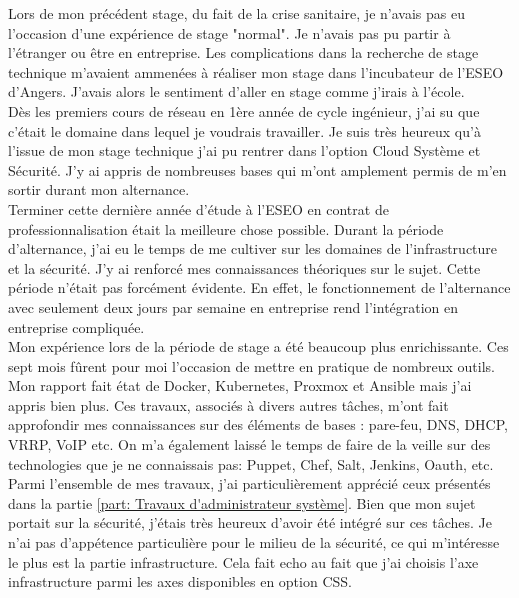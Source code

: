 \documentclass[12pt, a4paper, twoside]{article}
\begin{document}
Lors de mon précédent stage, du fait de la crise sanitaire, je n'avais pas eu l'occasion d'une expérience de stage "normal".
Je n'avais pas pu partir à l'étranger ou être en entreprise.
Les complications dans la recherche de stage technique m'avaient ammenées à réaliser mon stage dans l'incubateur de l'ESEO d'Angers.
J'avais alors le sentiment d'aller en stage comme j'irais à l'école.\\

Dès les premiers cours de réseau en 1ère année de cycle ingénieur, j'ai su que c'était le domaine dans lequel je voudrais travailler.
Je suis très heureux qu'à l'issue de mon stage technique j'ai pu rentrer dans l'option Cloud Système et Sécurité.
J'y ai appris de nombreuses bases qui m'ont amplement permis de m'en sortir durant mon alternance.\\

Terminer cette dernière année d'étude à l'ESEO en contrat de professionnalisation était la meilleure chose possible.
Durant la période d'alternance, j'ai eu le temps de me cultiver sur les domaines de l'infrastructure et la sécurité.
J'y ai renforcé mes connaissances théoriques sur le sujet.
Cette période n'était pas forcément évidente. 
En effet, le fonctionnement de l'alternance avec seulement deux jours par semaine en entreprise rend l'intégration en entreprise compliquée.\\

Mon expérience lors de la période de stage a été beaucoup plus enrichissante.
Ces sept mois fûrent pour moi l'occasion de mettre en pratique de nombreux outils.
Mon rapport fait état de \gls{Docker}, \gls{Kubernetes}, \gls{Proxmox} et \gls{Ansible} mais j'ai appris bien plus.
Ces travaux, associés à divers autres tâches, m'ont fait approfondir mes connaissances sur des éléments de bases : pare-feu, DNS, DHCP, VRRP, VoIP etc.
On m'a également laissé le temps de faire de la veille sur des technologies que je ne connaissais pas: Puppet, Chef, Salt, Jenkins, Oauth, etc.\\

Parmi l'ensemble de mes travaux, j'ai particulièrement apprécié ceux présentés dans la partie \ref{part: Travaux d'administrateur système}.
Bien que mon sujet portait sur la sécurité, j'étais très heureux d'avoir été intégré sur ces tâches.
Je n'ai pas d'appétence particulière pour le milieu de la sécurité, ce qui m'intéresse le plus est la partie infrastructure.
Cela fait echo au fait que j'ai choisis l'axe infrastructure parmi les axes disponibles en option CSS.\\
\end{document}
